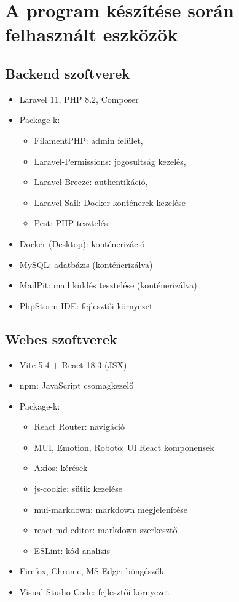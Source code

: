 \section{A program készítése során felhasznált eszközök}
\label{sec:softwares}

\subsection{Backend szoftverek}

\begin{itemize}
    \item Laravel 11, PHP 8.2, Composer
    \item Package-k: 
    \begin{itemize}
        \item FilamentPHP: admin felület,
        \item Laravel-Permissions: jogosultság kezelés,
        \item Laravel Breeze: authentikáció,
        \item Laravel Sail: Docker konténerek kezelése
        \item Pest: PHP tesztelés
    \end{itemize}
    \item Docker (Desktop): konténerizáció
    \item MySQL: adatbázis (konténerizálva)
    \item MailPit: mail küldés tesztelése (konténerizálva)
    \item PhpStorm IDE: fejlesztői környezet
\end{itemize}

\subsection{Webes szoftverek}

\begin{itemize}
    \item Vite 5.4 + React 18.3 (JSX)
    \item npm: JavaScript csomagkezelő
    \item Package-k: 
    \begin{itemize}
        \item React Router: navigáció
        \item MUI, Emotion, Roboto: UI React komponensek
        \item Axios: kérések
        \item js-cookie: sütik kezelése
        \item mui-markdown: markdown megjelenítése
        \item react-md-editor: markdown szerkesztő
        \item ESLint: kód analízis
    \end{itemize}
    \item Firefox, Chrome, MS Edge: böngészők
    \item Visual Studio Code: fejlesztői környezet
\end{itemize}